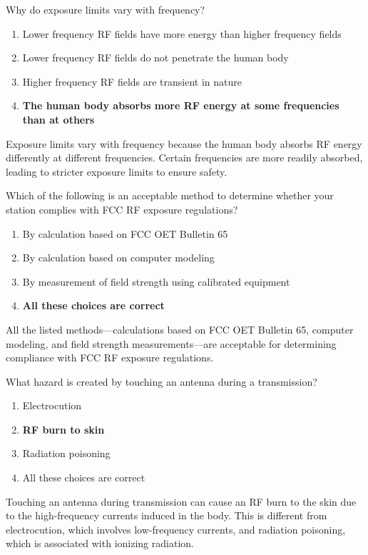 
\begin{tcolorbox}[colback=gray!10!white,colframe=black!75!black,title={T0C05}]
Why do exposure limits vary with frequency?
\begin{enumerate}[label=\Alph*),noitemsep]
    \item Lower frequency RF fields have more energy than higher frequency fields
    \item Lower frequency RF fields do not penetrate the human body
    \item Higher frequency RF fields are transient in nature
    \item \textbf{The human body absorbs more RF energy at some frequencies than at others}
\end{enumerate}
\end{tcolorbox}
Exposure limits vary with frequency because the human body absorbs RF energy differently at different frequencies. Certain frequencies are more readily absorbed, leading to stricter exposure limits to ensure safety.


\begin{tcolorbox}[colback=gray!10!white,colframe=black!75!black,title={T0C06}]
Which of the following is an acceptable method to determine whether your station complies with FCC RF exposure regulations?
\begin{enumerate}[label=\Alph*),noitemsep]
    \item By calculation based on FCC OET Bulletin 65
    \item By calculation based on computer modeling
    \item By measurement of field strength using calibrated equipment
    \item \textbf{All these choices are correct}
\end{enumerate}
\end{tcolorbox}
All the listed methods—calculations based on FCC OET Bulletin 65, computer modeling, and field strength measurements—are acceptable for determining compliance with FCC RF exposure regulations.


\begin{tcolorbox}[colback=gray!10!white,colframe=black!75!black,title={T0C07}]
What hazard is created by touching an antenna during a transmission?
\begin{enumerate}[label=\Alph*),noitemsep]
    \item Electrocution
    \item \textbf{RF burn to skin}
    \item Radiation poisoning
    \item All these choices are correct
\end{enumerate}
\end{tcolorbox}
Touching an antenna during transmission can cause an RF burn to the skin due to the high-frequency currents induced in the body. This is different from electrocution, which involves low-frequency currents, and radiation poisoning, which is associated with ionizing radiation.

